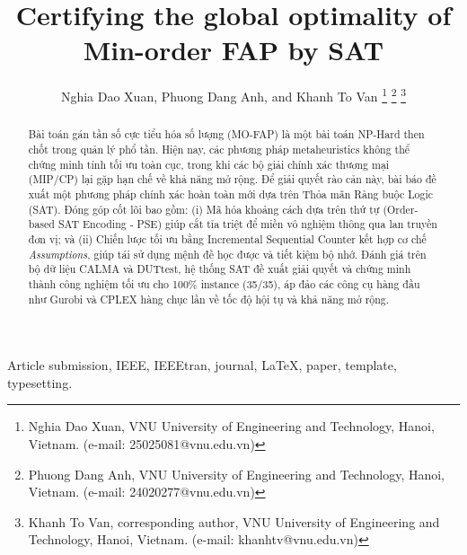 \documentclass[letterpaper,journal]{IEEEtran}
\begin{document}
\title{Certifying the global optimality of Min-order FAP by SAT}

\author{Nghia Dao Xuan, Phuong Dang Anh, and Khanh To Van
\thanks{Nghia Dao Xuan, VNU University of Engineering and Technology, Hanoi, Vietnam. (e-mail: 25025081@vnu.edu.vn)}%
\thanks{Phuong Dang Anh, VNU University of Engineering and Technology, Hanoi, Vietnam. (e-mail: 24020277@vnu.edu.vn)}%
\thanks{Khanh To Van, corresponding author, VNU University of Engineering and Technology, Hanoi, Vietnam. (e-mail: khanhtv@vnu.edu.vn)}
}



\maketitle

\begin{abstract}
Bài toán gán tần số cực tiểu hóa số lượng (MO-FAP) là một bài toán NP-Hard then chốt trong quản lý phổ tần. 
Hiện nay, các phương pháp metaheuristics không thể chứng minh tính tối ưu toàn cục, trong khi các bộ giải chính xác thương mại (MIP/CP) lại gặp hạn chế về khả năng mở rộng. Để giải quyết rào cản này, bài báo đề xuất một phương pháp chính xác hoàn toàn mới dựa trên Thỏa mãn Ràng buộc Logic (SAT). 
Đóng góp cốt lõi bao gồm: (i) Mã hóa khoảng cách dựa trên thứ tự (Order-based SAT Encoding - PSE) giúp cắt tỉa triệt để miền vô nghiệm thông qua lan truyền đơn vị; và (ii) Chiến lược tối ưu bằng Incremental Sequential Counter kết hợp cơ chế \textit{Assumptions}, giúp tái sử dụng mệnh đề học được và tiết kiệm bộ nhớ. 
Đánh giá trên bộ dữ liệu CALMA và DUTtest, hệ thống SAT đề xuất giải quyết và chứng minh thành công nghiệm tối ưu cho 100\% instance (35/35), áp đảo các công cụ hàng đầu như Gurobi và CPLEX hàng chục lần về tốc độ hội tụ và khả năng mở rộng.
\end{abstract}

\begin{IEEEkeywords}
Article submission, IEEE, IEEEtran, journal, \LaTeX, paper, template, typesetting.
\end{IEEEkeywords}
\end{document}
